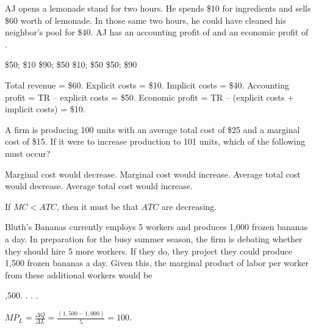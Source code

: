 \documentclass[addpoints,11pt]{exam}
\theoremstyle{definition}
\newcommand{\blank}[0]{\underline{\hspace{3cm}}}
\begin{document}
\begin{questions}
	
			\question AJ opens a lemonade stand for two hours. He spends \$10 for ingredients and sells \$60 worth of lemonade. In those same two hours, he could have cleaned his neighbor's pool for \$40. AJ has an accounting profit of \blank and an economic profit of \blank.
			
			\begin{choices}
				\CorrectChoice \$50; \$10
				\choice \$90; \$50
				\choice \$10; \$50
				\choice \$50; \$90
			\end{choices}
			
			\begin{solution}
				Total revenue = \$60. Explicit costs = \$10. Implicit costs = \$40. Accounting profit = TR -- explicit costs = \$50. Economic profit = TR -- (explicit costs + implicit costs) = \$10.
			\end{solution}
			
			\question A firm is producing 100 units with an average total cost of \$25 and a marginal cost of \$15. If it were to increase production to 101 units, which of the following must occur?
			
			\begin{choices}
				\choice Marginal cost would decrease.
				\choice Marginal cost would increase.
				\CorrectChoice Average total cost would decrease.
				\choice Average total cost would increase.
			\end{choices}
			
			\begin{solution}
				If $MC < ATC$, then it must be that $ATC$ are decreasing.
			\end{solution}
			
			\question Bluth's Bananas currently employs 5 workers and produces 1,000 frozen bananas a day. In preparation for the busy summer season, the firm is debating whether they should hire 5 more workers. If they do, they project they could produce 1,500 frozen bananas a day. Given this, the marginal product of labor per worker from these additional workers would be
			
			\begin{choices}
				\choice 1,500.
				\choice 500.
				\choice 150.
				\CorrectChoice 100.
			\end{choices}
			
			\begin{solution}
				$MP_L = \frac{\Delta Q}{\Delta L} = \frac{(1,500 - 1,000)}{5} = 100.$
			\end{solution}
			

\end{questions}
\end{document}
